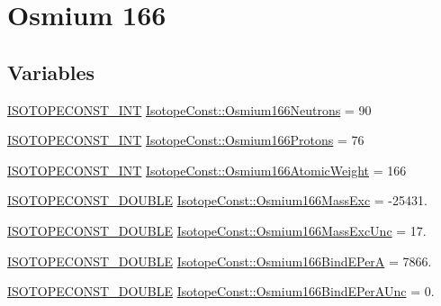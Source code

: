 \hypertarget{group___isotope_const-_osmium-_os166}{}\section{Osmium 166}
\label{group___isotope_const-_osmium-_os166}
\subsection*{Variables}
\begin{DoxyCompactItemize}
\item 
\mbox{\hyperlink{group___isotope_const-_macros_ga5f18360b3e99483a35c32d789e62621c}{I\+S\+O\+T\+O\+P\+E\+C\+O\+N\+S\+T\+\_\+\+I\+NT}} \mbox{\hyperlink{group___isotope_const-_osmium-_os166_gaa1cbf79dbe5bd66e412387f8e9346068}{Isotope\+Const\+::\+Osmium166\+Neutrons}} = 90
\item 
\mbox{\hyperlink{group___isotope_const-_macros_ga5f18360b3e99483a35c32d789e62621c}{I\+S\+O\+T\+O\+P\+E\+C\+O\+N\+S\+T\+\_\+\+I\+NT}} \mbox{\hyperlink{group___isotope_const-_osmium-_os166_gac212efef17f995a41214e83123e96c5d}{Isotope\+Const\+::\+Osmium166\+Protons}} = 76
\item 
\mbox{\hyperlink{group___isotope_const-_macros_ga5f18360b3e99483a35c32d789e62621c}{I\+S\+O\+T\+O\+P\+E\+C\+O\+N\+S\+T\+\_\+\+I\+NT}} \mbox{\hyperlink{group___isotope_const-_osmium-_os166_ga1a9a7adc1d5ee152aca6e8e3ae66f528}{Isotope\+Const\+::\+Osmium166\+Atomic\+Weight}} = 166
\item 
\mbox{\hyperlink{group___isotope_const-_macros_ga8f45a7272ce02c0b4c65c44636ed719a}{I\+S\+O\+T\+O\+P\+E\+C\+O\+N\+S\+T\+\_\+\+D\+O\+U\+B\+LE}} \mbox{\hyperlink{group___isotope_const-_osmium-_os166_gaf3dc1cbac1b8d27d3c76646e1b28b5de}{Isotope\+Const\+::\+Osmium166\+Mass\+Exc}} = -\/25431.
\item 
\mbox{\hyperlink{group___isotope_const-_macros_ga8f45a7272ce02c0b4c65c44636ed719a}{I\+S\+O\+T\+O\+P\+E\+C\+O\+N\+S\+T\+\_\+\+D\+O\+U\+B\+LE}} \mbox{\hyperlink{group___isotope_const-_osmium-_os166_ga7029b5ab4d36297237ea0ca4bf4cce28}{Isotope\+Const\+::\+Osmium166\+Mass\+Exc\+Unc}} = 17.
\item 
\mbox{\hyperlink{group___isotope_const-_macros_ga8f45a7272ce02c0b4c65c44636ed719a}{I\+S\+O\+T\+O\+P\+E\+C\+O\+N\+S\+T\+\_\+\+D\+O\+U\+B\+LE}} \mbox{\hyperlink{group___isotope_const-_osmium-_os166_gaabb84b11facf7b363ca0b4bc95be44f8}{Isotope\+Const\+::\+Osmium166\+Bind\+E\+PerA}} = 7866.
\item 
\mbox{\hyperlink{group___isotope_const-_macros_ga8f45a7272ce02c0b4c65c44636ed719a}{I\+S\+O\+T\+O\+P\+E\+C\+O\+N\+S\+T\+\_\+\+D\+O\+U\+B\+LE}} \mbox{\hyperlink{group___isotope_const-_osmium-_os166_ga3baa486a6b869b9d766d4d79cbf88018}{Isotope\+Const\+::\+Osmium166\+Bind\+E\+Per\+A\+Unc}} = 0.

\end{DoxyCompactItemize}
